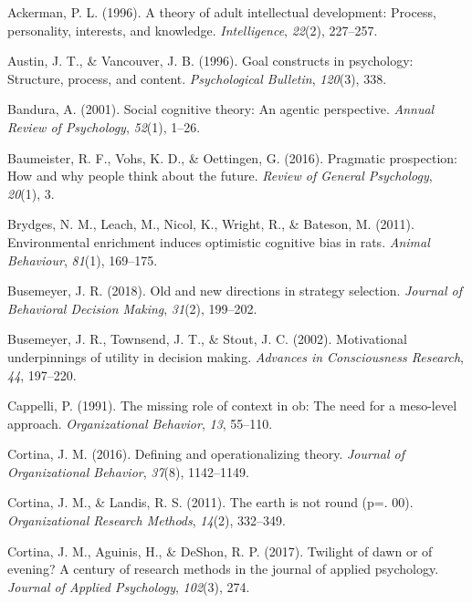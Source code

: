 \documentclass[english,man]{apa6}
\theoremstyle{definition}
\theoremstyle{definition}
\theoremstyle{definition}
\theoremstyle{remark}
\begin{document}
\setlength{\parindent}{-0.5in} \setlength{\leftskip}{0.5in}

\hypertarget{refs}{}
\hypertarget{ref-ackerman1996}{}
Ackerman, P. L. (1996). A theory of adult intellectual development:
Process, personality, interests, and knowledge. \emph{Intelligence},
\emph{22}(2), 227--257.

\hypertarget{ref-austin1996}{}
Austin, J. T., \& Vancouver, J. B. (1996). Goal constructs in
psychology: Structure, process, and content. \emph{Psychological
Bulletin}, \emph{120}(3), 338.

\hypertarget{ref-bandura2001}{}
Bandura, A. (2001). Social cognitive theory: An agentic perspective.
\emph{Annual Review of Psychology}, \emph{52}(1), 1--26.

\hypertarget{ref-baumeister2016}{}
Baumeister, R. F., Vohs, K. D., \& Oettingen, G. (2016). Pragmatic
prospection: How and why people think about the future. \emph{Review of
General Psychology}, \emph{20}(1), 3.

\hypertarget{ref-brydges2011}{}
Brydges, N. M., Leach, M., Nicol, K., Wright, R., \& Bateson, M. (2011).
Environmental enrichment induces optimistic cognitive bias in rats.
\emph{Animal Behaviour}, \emph{81}(1), 169--175.

\hypertarget{ref-busemeyer2018}{}
Busemeyer, J. R. (2018). Old and new directions in strategy selection.
\emph{Journal of Behavioral Decision Making}, \emph{31}(2), 199--202.

\hypertarget{ref-busemeyer2002}{}
Busemeyer, J. R., Townsend, J. T., \& Stout, J. C. (2002). Motivational
underpinnings of utility in decision making. \emph{Advances in
Consciousness Research}, \emph{44}, 197--220.

\hypertarget{ref-cappelli1991}{}
Cappelli, P. (1991). The missing role of context in ob: The need for a
meso-level approach. \emph{Organizational Behavior}, \emph{13}, 55--110.

\hypertarget{ref-Cortina2016}{}
Cortina, J. M. (2016). Defining and operationalizing theory.
\emph{Journal of Organizational Behavior}, \emph{37}(8), 1142--1149.

\hypertarget{ref-Cortina2011}{}
Cortina, J. M., \& Landis, R. S. (2011). The earth is not round (p=.
00). \emph{Organizational Research Methods}, \emph{14}(2), 332--349.

\hypertarget{ref-Cortina2017}{}
Cortina, J. M., Aguinis, H., \& DeShon, R. P. (2017). Twilight of dawn
or of evening? A century of research methods in the journal of applied
psychology. \emph{Journal of Applied Psychology}, \emph{102}(3), 274.
\end{document}
